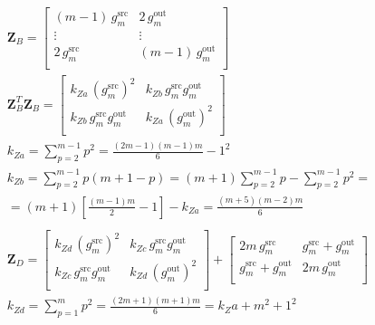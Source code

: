 \documentclass[journal,onecolumn]{IEEEtran}
\begin{document}
    \begin{gather*}
        \mathbf{Z}^{}_{B} = \left[ \begin{array}{rr} 
            (m - 1)\, g^\text{src}_{m} & 2\, g^\text{out}_{m} \\
            \vdots \quad & \vdots \quad \\
            2\, g^\text{src}_{m} & (m - 1)\, g^\text{out}_{m} \\
        \end{array} \right] \\
        \mathbf{Z}^{T}_{B}\mathbf{Z}^{}_{B} = \begin{bmatrix}
            k_{Za}\, (g^\text{src}_{m})^2 & k_{Zb}\, g^\text{src}_{m} g^\text{out}_{m}  \\
            k_{Zb}\, g^\text{src}_{m} g^\text{out}_{m} & k_{Za}\, (g^\text{out}_{m})^2 \\
        \end{bmatrix} \\
        k_{Za} = \sum^{m-1}_{p=2} p^2 = \frac{(2m - 1)(m - 1)m}{6} - 1^2 \\  %
        k_{Zb} = \sum^{m-1}_{p=2} p(m + 1 - p) = (m + 1)\sum^{m-1}_{p=2} p - \sum^{m-1}_{p=2} p^2 = \\ = (m + 1) \left[ \frac{(m - 1)m}{2} - 1 \right] - k_{Za} = \frac{(m + 5)(m - 2)m}{6}  %
         \\ \\
        \mathbf{Z}^{}_{D}= \begin{bmatrix}
            k_{Zd}\, (g^\text{src}_{m})^2 & k_{Zc}\, g^\text{src}_{m} g^\text{out}_{m} \\
            k_{Zc}\, g^\text{src}_{m} g^\text{out}_{m} & k_{Zd}\, (g^\text{out}_{m})^2 \\
        \end{bmatrix} + \begin{bmatrix}
            2m\, g^\text{src}_{m} & g^\text{src}_{m} + g^\text{out}_{m} \\
            g^\text{src}_{m} + g^\text{out}_{m} & 2m\, g^\text{out}_{m} \\
        \end{bmatrix} \\
        k_{Zd} = \sum^{m}_{p=1} p^2 = \frac{(2m +1)(m + 1)m}{6} = k_Za + m^2 + 1^2 \\

\end{gather*}
\end{document}
